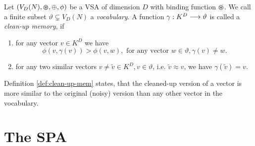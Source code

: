 \begin{defn}
	\label{def:clean-up-mem}
	Let $(V_{D}(N), \varoast, \oplus, \phi)$ be a \acrfull{VSA} of dimension $D$ with binding function $\varoast$.
	We call a finite subset $\vartheta \subsetneq V_{D}(N)$ a \emph{vocabulary}.
	A function $\gamma: K^{D} \longrightarrow \vartheta$ is called a \emph{clean-up memory}, if
	\begin{enumerate}
		\item for any vector $v\in K^{D}$ we have
		\[
		\phi\left(v, \gamma(v)\right) > \phi\left(v, w\right), \textrm{ for any vector } w \in \vartheta, \gamma(v) \neq w.
		\]
		\item for any two similar vectors $ v \neq \tilde{v} \in K^{D}, v \in \vartheta$, i.e. $\tilde{v} \approx v$, we have $\gamma(\tilde{v})=v$.
	\end{enumerate}
\end{defn}
Definition \ref{def:clean-up-mem} states, that the cleaned-up version of a vector is more similar to the original (noisy) version than any other vector in the vocabulary.

\section{The \acl{SPA}}
\label{sec:spa}

